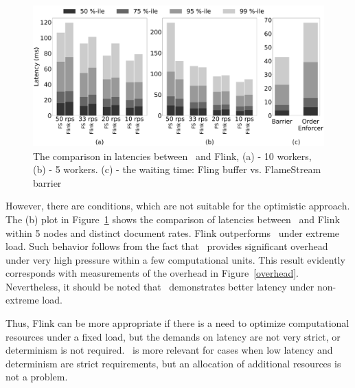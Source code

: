 \begin{figure}[ht]
  \centering
  \includegraphics[width=\textwidth]{pics/comp-index-quantiles}
  \caption{The comparison in latencies between \FlameStream\ and Flink, (a) - 10 workers, (b) - 5 workers. (c) - the waiting time: Fling buffer vs. FlameStream barrier}
  \label {fs-index-quantiles}
\end{figure}

However, there are conditions, which are not suitable for the optimistic approach. The (b) plot in Figure~\ref{fs-index-quantiles} shows the comparison of latencies between \FlameStream\ and Flink within 5 nodes and distinct document rates. Flink outperforms \FlameStream\ under extreme load. Such behavior follows from the fact that \FlameStream\ provides significant overhead under very high pressure within a few computational units. This result evidently corresponds with measurements of the overhead in Figure~\ref{overhead}. Nevertheless, it should be noted that \FlameStream\ demonstrates better latency under non-extreme load.

Thus, Flink can be more appropriate if there is a need to optimize computational resources under a fixed load, but the demands on latency are not very strict, or determinism is not required. \FlameStream\ is more relevant for cases when low latency and determinism are strict requirements, but an allocation of additional resources is not a problem.  
